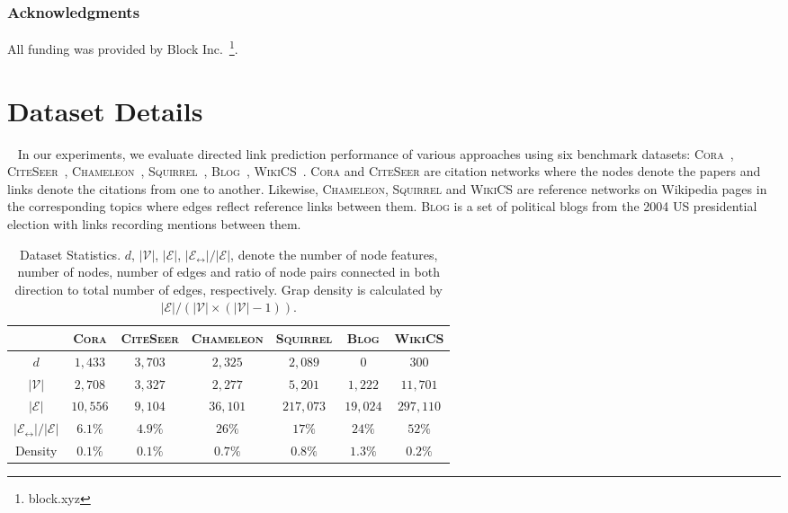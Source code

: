 \documentclass{article}
\begin{document}
\subsubsection*{Acknowledgments}
All funding was provided by Block Inc.~\footnote{block.xyz}.




\newpage
\appendix

\section{Dataset Details}~\label{app:datasets}
In our experiments, we evaluate directed link prediction performance of various approaches using six benchmark datasets: \textsc{Cora}~\citep{yang2016revisiting}, \textsc{CiteSeer}~\citep{yang2016revisiting}, \textsc{Chameleon}~\citep{rozemberczki2021multiscale}, \textsc{Squirrel}~\citep{rozemberczki2021multiscale}, \textsc{Blog}~\citep{he2022digrac}, \textsc{WikiCS}~\citep{mernyei2020wikics}. \textsc{Cora} and \textsc{CiteSeer} are citation networks where the nodes denote the papers and links denote the citations from one to another. Likewise, \textsc{Chameleon}, \textsc{Squirrel} and \textsc{WikiCS} are reference networks on Wikipedia pages in the corresponding topics where edges reflect reference links between them. \textsc{Blog} is a set of political blogs from the 2004 US presidential election with links recording mentions between them. 
\begin{table}[htbp]
    \caption{Dataset Statistics. $d$, $|\mathcal{V}|$, $|\mathcal{E}|$, ${|\mathcal{E}_\leftrightarrow|} / {|\mathcal{E}|}$, denote the number of node features, number of nodes, number of edges and ratio of node pairs connected in both direction to total number of edges, respectively. Grap density is calculated by $|\mathcal{E}| / (|\mathcal{V}| \times (|\mathcal{V}|-1))$.}
    \begin{center}
    \begin{tabular}{ccccccc}
     & \textsc{Cora} & \textsc{CiteSeer} & \textsc{Chameleon} & \textsc{Squirrel} & \textsc{Blog} & \textsc{WikiCS} \\ \hline
    $d$ & $1,433$ & $3,703$ & $2,325$ & $2,089$ & 0 & $300$ \\
    $|\mathcal{V}|$ & $2,708$ & $3,327$ & $2,277$ & $5,201$ & $1,222$ & $11,701$ \\
    $|\mathcal{E}|$ & $10,556$ & $9,104$ & $36,101$ & $217,073$ & $19,024$ & $297,110$ \\
    ${|\mathcal{E}_\leftrightarrow|} / {|\mathcal{E}|}$ & $6.1\%$ & $4.9\%$ & $26\%$ & $17\%$ & $24\%$ & $52\%$ \\
    Density & $0.1\%$ & $0.1\%$ & $0.7\%$ & $0.8\%$ & $1.3\%$ & $0.2\%$
    \end{tabular}
    \end{center}
\end{table}
\end{document}
